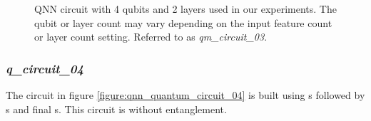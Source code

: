 \begin{figure}[!h]
	\centering
	\caption{QNN circuit with 4 qubits and 2 layers used in our experiments. The qubit or layer count may vary depending on the input feature count or layer count setting. Referred to as \textit{qm\_circuit\_03}.}
	\label{figure:qnn_quantum_circuit_03}
\end{figure}

\subsubsection{\textit{q\_circuit\_04}}
\label{subsubsection:qnn_quantum_circuit_04}
The circuit in figure \ref{figure:qnn_quantum_circuit_04} is built using \rxgate s followed by \rygate s and final \rzgate s. This circuit is without entanglement.

